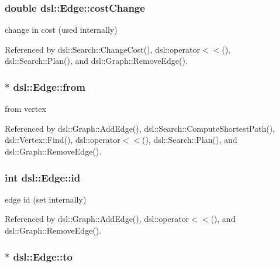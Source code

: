 \subsubsection[{cost\-Change}]{\setlength{\rightskip}{0pt plus 5cm}double {\bf dsl\-::\-Edge\-::cost\-Change}}\label{classdsl_1_1Edge_a509db0804dbae524bc34cf89a53183fb}


change in cost (used internally) 



\-Referenced by dsl\-::\-Search\-::\-Change\-Cost(), dsl\-::operator$<$$<$(), dsl\-::\-Search\-::\-Plan(), and dsl\-::\-Graph\-::\-Remove\-Edge().

\subsubsection[{from}]{$\ast$ {\bf dsl\-::\-Edge\-::from}}\label{classdsl_1_1Edge_a90a355b5bf47c67fcb20f795d88ef5e3}


from vertex 



\-Referenced by dsl\-::\-Graph\-::\-Add\-Edge(), dsl\-::\-Search\-::\-Compute\-Shortest\-Path(), dsl\-::\-Vertex\-::\-Find(), dsl\-::operator$<$$<$(), dsl\-::\-Search\-::\-Plan(), and dsl\-::\-Graph\-::\-Remove\-Edge().

\subsubsection[{id}]{\setlength{\rightskip}{0pt plus 5cm}int {\bf dsl\-::\-Edge\-::id}}\label{classdsl_1_1Edge_a274a19c8792a79675b643098c2524b84}


edge id (set internally) 



\-Referenced by dsl\-::\-Graph\-::\-Add\-Edge(), dsl\-::operator$<$$<$(), and dsl\-::\-Graph\-::\-Remove\-Edge().

\subsubsection[{to}]{$\ast$ {\bf dsl\-::\-Edge\-::to}}\label{classdsl_1_1Edge_aa2f851d9d63e51cf54b5d10412ef7735}


